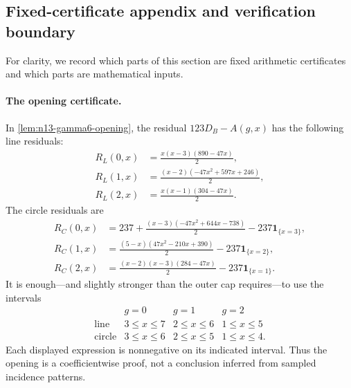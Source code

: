 \subsection{Fixed-certificate appendix and verification boundary}
\label{subsec:n13large-certificates}

For clarity, we record which parts of this section are fixed arithmetic
certificates and which parts are mathematical inputs.

\paragraph{The opening certificate.}
In \cref{lem:n13-gamma6-opening}, the residual
$123D_B-A(g,x)$ has the following line residuals:
\begin{align*}
 R_L(0,x)&=\frac{x(x-3)(890-47x)}2,\\
 R_L(1,x)&=\frac{(x-2)(-47x^2+597x+246)}2,\\
 R_L(2,x)&=\frac{x(x-1)(304-47x)}2.
\end{align*}
The circle residuals are
\begin{align*}
 R_C(0,x)&=237+\frac{(x-3)(-47x^2+644x-738)}2
                 -237\mathbf{1}_{\{x=3\}},\\
 R_C(1,x)&=\frac{(5-x)(47x^2-210x+390)}2
                 -237\mathbf{1}_{\{x=2\}},\\
 R_C(2,x)&=\frac{(x-2)(x-3)(284-47x)}2
                 -237\mathbf{1}_{\{x=1\}}.
\end{align*}
It is enough---and slightly stronger than the outer cap requires---to use
the intervals
\[
\begin{array}{c|ccc}
&g=0&g=1&g=2\\ \hline
\text{line}&3\leq x\leq7&2\leq x\leq6&1\leq x\leq5\\
\text{circle}&3\leq x\leq6&2\leq x\leq5&1\leq x\leq4.
\end{array}
\]
Each displayed expression is nonnegative on its indicated interval.  Thus
the opening is a coefficientwise proof, not a conclusion inferred from
sampled incidence patterns.

